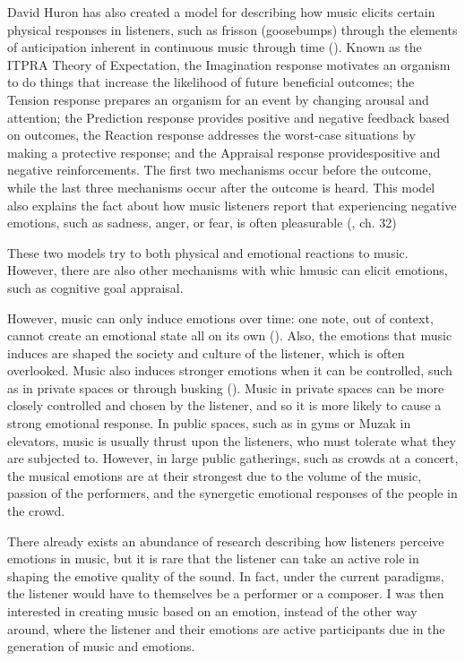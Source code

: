 \documentclass{article}
\renewcommand{\_}[1]{\underline{ #1 }}
\theoremstyle{definition}
\begin{document}
David Huron has also created a model for describing how music elicits certain physical responses in listeners, such as frisson (goosebumps) through the elements of anticipation inherent in continuous music through time (\cite{huron2006}). Known as the ITPRA Theory of Expectation, the Imagination response motivates an organism to do things that increase the likelihood of future beneficial outcomes; the Tension response prepares an organism for an event by changing arousal and attention; the Prediction response provides positive and negative feedback based on outcomes, the Reaction response addresses the worst-case situations by making a protective response; and the Appraisal response providespositive and negative reinforcements. The first two mechanisms occur before the outcome, while the last three mechanisms occur after the outcome is heard. This model also explains the fact about how  music listeners report that experiencing negative emotions, such as sadness, anger, or fear, is often pleasurable (\cite{juslin2019}, ch. 32)

These two models try to both physical and emotional reactions to music. However, there are also other mechanisms with whic hmusic can elicit emotions, such as cognitive goal appraisal.

However, music can only induce emotions over time: one note, out of context, cannot create an emotional state all on its own (\cite{schubert2001}). Also, the emotions that music induces are shaped the society and culture of the listener, which is often overlooked. Music also induces stronger emotions when it can be controlled, such as in private spaces or through busking (\cite{oneill2001}). Music in private spaces can be more closely controlled and chosen by the listener, and so it is more likely to cause a strong emotional response. In public spaces, such as in gyms or Muzak in elevators, music is usually thrust upon the listeners, who must tolerate what they are subjected to. However, in large public gatherings, such as crowds at a concert, the musical emotions are at their strongest due to the volume of the music, passion of the performers, and the synergetic emotional responses of the people in the crowd. 

There already exists an abundance of research describing how listeners perceive emotions in music, but it is rare that the listener can take an active role in shaping the emotive quality of the sound. In fact, under the current paradigms, the listener would have to themselves be a performer or a composer. I was then interested in creating music based on an emotion, instead of the other way around, where the listener and their emotions are active participants due in the generation of music and emotions.
\end{document}
